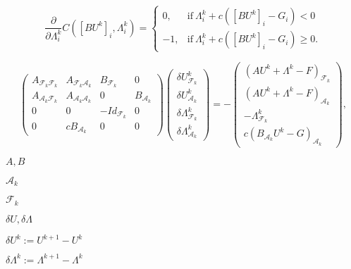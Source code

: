 \documentclass{article}
\begin{document}
\begin{equation*} \dfrac{\partial}{\partial\Lambda^k_i}C([BU^k]_i,\Lambda^k_i) = \begin{cases} 0,& \text{if}\ \Lambda^k_i + c([BU^k]_i - G_i)< 0\\ -1,& \text{if}\ \Lambda^k_i + c([BU^k]_i - G_i)\geq 0. \end{cases} \end{equation*}
\pagebreak

\begin{equation*} \begin{pmatrix} A_{\mathcal{F}_k\mathcal{F}_k} & A_{\mathcal{F}_k\mathcal{A}_k} & B_{\mathcal{F}_k} & 0\\ A_{\mathcal{A}_k\mathcal{F}_k} & A_{\mathcal{A}_k\mathcal{A}_k} & 0 & B_{\mathcal{A}_k}\\ 0 & 0 & -Id_{\mathcal{F}_k} & 0\\ 0 & cB_{\mathcal{A}_k} & 0 & 0 \end{pmatrix} \begin{pmatrix} \delta U^k_{\mathcal{F}_k}\\ \delta U^k_{\mathcal{A}_k}\\ \delta \Lambda^k_{\mathcal{F}_k}\\ \delta \Lambda^k_{\mathcal{A}_k} \end{pmatrix} = -\begin{pmatrix} (AU^k + \Lambda^k - F)_{\mathcal{F}_k}\\ (AU^k + \Lambda^k - F)_{\mathcal{A}_k}\\ -\Lambda^k_{\mathcal{F}_k}\\ c(B_{\mathcal{A}_k} U^k - G)_{\mathcal{A}_k} \end{pmatrix}, \end{equation*}
\pagebreak

$A,B$
\pagebreak

${\mathcal{A}_k}$
\pagebreak

${\mathcal{F}_k}$
\pagebreak

$\delta U, \delta \Lambda$
\pagebreak

$\delta U^k := U^{k+1} - U^k$
\pagebreak

$\delta \Lambda^k := \Lambda^{k+1} - \Lambda^k$
\pagebreak
\end{document}
